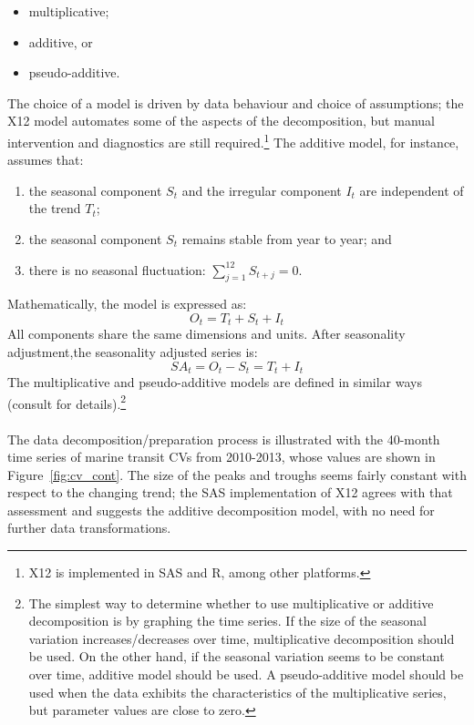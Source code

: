 \documentclass[20pt,landscape,footrule,headrule]{foils}
\begin{document}
\begin{center}
\begin{itemize} 
\item multiplicative;
\item additive, or 
\item pseudo-additive.
\end{itemize}
The choice of a model is driven by data behaviour and choice of assumptions; the X12 model automates some of the aspects of the decomposition, but manual intervention and diagnostics are still required.\footnote{X12 is implemented in SAS and R, among other platforms.}
The additive model, for instance, assumes that: 
\begin{enumerate} \item the seasonal component $S_t$ and the irregular component $I_t$ are independent of the trend $T_t$; \item  the seasonal component $S_t$ remains stable from year to year; and \item there is no seasonal fluctuation: $\sum_{j=1}^{12} S_{t+j}=0 $.\end{enumerate} 
Mathematically, the model is expressed as:
    \begin{equation*}
        O_t = T_t + S_t + I_t
    \end{equation*}
    All components share the same dimensions and units. After seasonality adjustment,the seasonality adjusted series is:
    \begin{equation*}
        SA_t = O_t - S_t = T_t + I_t
    \end{equation*}
The multiplicative and pseudo-additive models are defined in similar ways (consult \cite{TS_FH,TS_FMBOC,TS_ICTSA,TS_SAETS,TS_JL} for details).\footnote{The simplest way to determine whether to use multiplicative or additive decomposition is by graphing the time series. If the size of the seasonal variation increases/decreases over time, multiplicative decomposition should be used. On the other hand, if the seasonal variation seems to be constant over time, additive model should be used. A pseudo-additive model should be used when the data exhibits the characteristics of the multiplicative series, but parameter values are close to zero.} \ \\ \ \\ 
The data decomposition/preparation process is illustrated with the 40-month time series of marine transit CVs from 2010-2013, whose values are shown in Figure~\ref{fig:cv_cont}.  The size of the peaks and troughs seems fairly constant with respect to the changing trend; the SAS implementation of X12 agrees with that assessment and suggests the additive decomposition model, with  no need for further data transformations.

\end{center}
\end{document}
